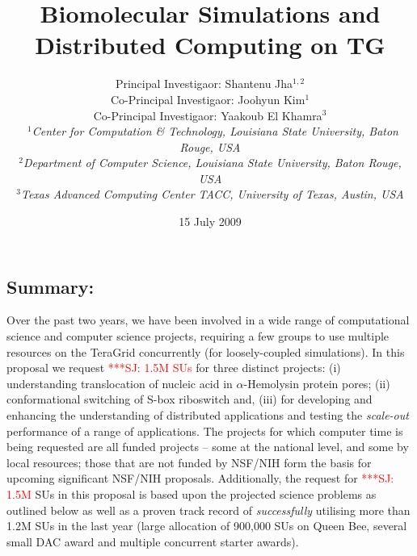 \documentclass[a4paper,10pt]{article}
\begin{document}
\title{\large Biomolecular Simulations and Distributed Computing on TG}

\author{Principal Investigaor: Shantenu Jha$^{1,2}$ \\ Co-Principal Investigaor: Joohyun Kim$^{1}$ \\ Co-Principal Investigaor: Yaakoub El Khamra$^{3}$\\\
   \small{\emph{$^{1}$Center for Computation \& Technology, Louisiana State University, Baton Rouge, 
USA}}
\\
  \small{\emph{$^{2}$Department of Computer Science, Louisiana State
      University, Baton Rouge, USA}}
\\
  \small{\emph{$^{3}$Texas Advanced Computing Center TACC, University of Texas, Austin, USA}}}

\newif\ifdraft
\drafttrue
\ifdraft
\newcommand{\amnote}[1]{ {\textcolor{magenta} { ***AM: #1c }}}
\newcommand{\jhanote}[1]{ {\textcolor{red} { ***SJ: #1 }}}
\newcommand{\michaelnote}[1]{ {\textcolor{blue} { ***MM: #1 }}}
\else
\newcommand{\amnote}[1]{}
\newcommand{\jhanote}[1]{}
\newcommand{\michaelnote}[1]{ {\textcolor{blue} { ***MM: #1 }}}
\fi


\date{15 July 2009}

\maketitle

\subsection*{Summary:} Over the past two years, we have been involved in a wide range of computational science and computer science projects, requiring a few groups to use multiple resources on the TeraGrid concurrently (for loosely-coupled simulations). In this proposal we request \jhanote{1.5M SUs} for three distinct projects: (i) understanding translocation of nucleic acid in $\alpha$-Hemolysin protein pores; (ii) conformational switching of S-box riboswitch and, (iii) for developing and enhancing the understanding of distributed applications and testing the {\it scale-out } performance of a range of applications. The projects for which computer time is being requested are all funded projects -- some at the national level, and some by local resources; those that are not funded by NSF/NIH form the basis for upcoming significant NSF/NIH proposals.  Additionally, the request for \jhanote{1.5M} SUs in this proposal is based upon the projected science problems as outlined below as well as a proven track record of {\it successfully} utilising more than 1.2M SUs in the last year (large allocation of 900,000 SUs on Queen Bee, several small DAC award and multiple concurrent starter awards).
\end{document}
